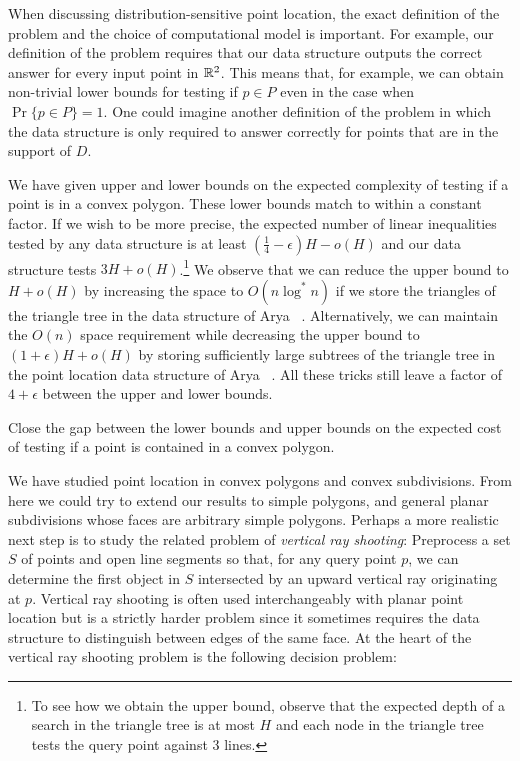 \documentclass[charterfonts,lotsofwhite]{patmorin}
\begin{document}
When discussing distribution-sensitive point location, the exact
definition of the problem and the choice of computational model is
important.  For example, our definition of the problem requires that
our data structure outputs the correct answer for every input point in
$\mathbb{R}^2$.  This means that, for example, we can obtain non-trivial lower
bounds for testing if $p\in P$ even in the case when $\Pr\{p\in
P\}=1$. One could imagine another definition of the problem in which
the data structure is only required to answer correctly for points
that are in the support of $D$.

We have given upper and lower bounds on the expected complexity of
testing if a point is in a convex polygon.  These lower bounds match
to within a constant factor.  If we wish to be more precise, the
expected number of linear inequalities tested by any data structure is
at least $(\frac{1}{4}-\epsilon)H-o(H)$ and our data structure tests
$3H+o(H)$.\footnote{To see how we obtain the upper bound, observe that
the expected depth of a search in the triangle tree is at most $H$ and
each node in the triangle tree tests the query point against 3 lines.}
We observe that we can reduce the upper bound to $H+o(H)$ by
increasing the space to $O(n\log^* n)$ if we store the triangles of
the triangle tree in the data structure of Arya \etal\ \cite{amm01a}.
Alternatively, we can maintain the $O(n)$ space requirement while
decreasing the upper bound to $(1+\epsilon)H+o(H)$ by storing sufficiently
large subtrees of the triangle tree in the point location data
structure of Arya \etal\ \cite{amm01a,amm00}.  All these tricks still
leave a factor of $4+\epsilon$ between the upper and lower bounds.

\begin{op}
Close the gap between the lower bounds and upper bounds on the
expected cost of testing if a point is contained in a convex polygon.
\end{op}

We have studied point location in convex polygons and convex
subdivisions.  From here we could try to extend our results to simple
polygons, and general planar subdivisions whose faces are arbitrary
simple polygons. Perhaps a more realistic next step is to study the
related problem of \emph{vertical ray shooting}:  Preprocess a set $S$
of points and open line segments so that, for any query point $p$, we
can determine the first object in $S$ intersected by an upward
vertical ray originating at $p$.  Vertical ray shooting is often used
interchangeably with planar point location but is a strictly harder
problem since it sometimes requires the data structure to distinguish
between edges of the same face.  At the heart of the vertical ray
shooting problem is the following decision problem:
\end{document}
